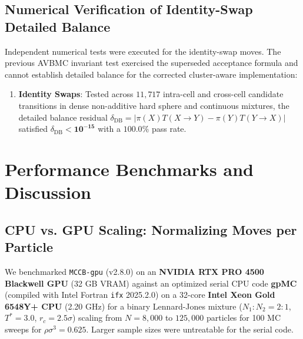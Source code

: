 \documentclass[final,5p,times,twocolumn]{elsarticle}
\begin{document}
\subsection{Numerical Verification of Identity-Swap Detailed Balance}
\label{sec:verif_db}

Independent numerical tests were executed for the identity-swap moves.
The previous AVBMC invariant test exercised the superseded acceptance
formula and cannot establish detailed balance for the corrected
cluster-aware implementation:
\begin{enumerate}
    \item \textbf{Identity Swaps}: Tested across $11{,}717$ intra-cell
      and cross-cell candidate transitions in dense non-additive hard
      sphere and continuous mixtures, the detailed balance residual
      $\delta_{\text{DB}} = |\pi(X)T(X\to Y) - \pi(Y)T(Y\to X)|$
      satisfied $\delta_{\text{DB}} < \mathbf{10^{-15}}$ with a
      $100.0\%$ pass rate. 
\end{enumerate}

\section{Performance Benchmarks and Discussion}
\label{sec:benchmarks}

\subsection{CPU vs. GPU Scaling: Normalizing Moves per Particle}
\label{sec:bench_cpu_gpu}

We benchmarked \texttt{MCCB-gpu} (v2.8.0) on an \textbf{NVIDIA RTX PRO
  4500 Blackwell GPU} (32 GB VRAM) against an optimized serial CPU
code \textbf{gpMC}~\cite{gpmc2026} (compiled with Intel Fortran
\texttt{ifx} 2025.2.0) on a 32-core \textbf{Intel Xeon Gold 6548Y+
  CPU} (2.20 GHz) for a binary Lennard-Jones mixture ($N_1{:}N_2 = 2{:}1$,
$T^* = 3.0$, $r_c = 2.5\sigma$) scaling from $N = 8{,}000$ to
$125{,}000$ particles for 100 MC sweeps for $\rho\sigma^3=0.625$. Larger sample sizes were
untreatable for the serial code.  
\end{document}
